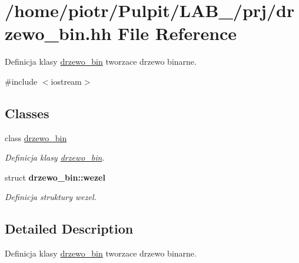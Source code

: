 \hypertarget{drzewo__bin_8hh}{\section{/home/piotr/\-Pulpit/\-L\-A\-B\-\_/prj/drzewo\-\_\-bin.hh \-File \-Reference}
\label{drzewo__bin_8hh}
}


\-Definicja klasy \hyperlink{classdrzewo__bin}{drzewo\-\_\-bin} tworzace drzewo binarne.  


{\ttfamily \#include $<$iostream$>$}\*
\subsection*{\-Classes}
\begin{DoxyCompactItemize}
\item 
class \hyperlink{classdrzewo__bin}{drzewo\-\_\-bin}
\begin{DoxyCompactList}\small\item\em \-Definicja klasy \hyperlink{classdrzewo__bin}{drzewo\-\_\-bin}. \end{DoxyCompactList}\item 
struct {\bfseries drzewo\-\_\-bin\-::wezel}
\begin{DoxyCompactList}\small\item\em \-Definicja struktury wezel. \end{DoxyCompactList}\end{DoxyCompactItemize}


\subsection{\-Detailed \-Description}
\-Definicja klasy \hyperlink{classdrzewo__bin}{drzewo\-\_\-bin} tworzace drzewo binarne. 